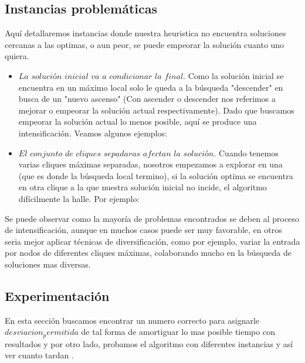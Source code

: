 \subsection{Instancias problemáticas}

 Aquí detallaremos instancias donde nuestra heuristica no encuentra soluciones cercanas a las optimas, o aun peor, se puede empeorar la solución cuanto uno quiera.

\begin{itemize}
 
  \item $La$ $solución$ $inicial$ $va$ $a$ $condicionar$ $la$ $final$. Como la solución inicial se encuentra en un máximo local solo le queda a la búsqueda "descender" en busca de un "nuevo ascenso" (Con ascender o descender nos referimos a mejorar o empeorar la solución actual respectivamente). Dado que buscamos empeorar la solución actual lo menos posible, aquí se produce una intensificación. Veamos algunos ejemplos:

  \item $El$ $conjunto$ $de$ $cliques$ $sepadaras$ $afectan$ $la$ $solución$. Cuando tenemos varias cliques máximas separadas, nosotros empezamos a explorar en una (que es donde la búsqueda local termino), si la solución optima se encuentra en otra clique a la que nuestra solución inicial no incide, el algoritmo difícilmente la halle. Por ejemplo:

\end{itemize}

Se puede observar como la mayoría de problemas encontrados se deben al proceso de intensificación, aunque en muchos casos puede ser muy favorable, en otros seria mejor aplicar técnicas de diversificación, como por ejemplo, variar la entrada por nodos de diferentes cliques máximas, colaborando mucho en la búsqueda de soluciones mas diversas.

\subsection{Experimentación}

 En esta sección buscamos encontrar un numero correcto para asignarle $desviacion_permitida$ de tal forma de amortiguar lo mas posible tiempo con resultados y por otro lado, probamos el algoritmo con diferentes instancias y así ver cuanto tardan .
